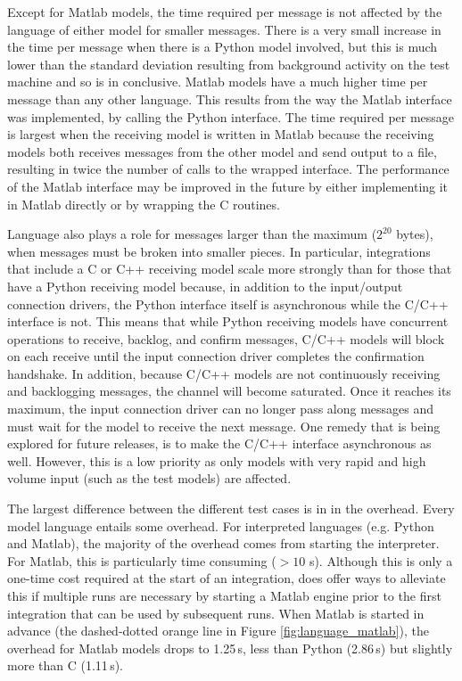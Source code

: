 \documentclass[journal]{IEEEtran}
\newcommand{\todo}[1]{{\color{red}{#1}}}
\newcommand{\pkg}{{\tt \todo{cis\_interface}}{}}
\begin{document}
Except for Matlab models, the time required per message is not affected by the language of either model for smaller messages. There is a very small increase in the time per message when there is a Python model involved, but this is much lower than the standard deviation resulting from background activity on the test machine and so is in conclusive. Matlab models have a much higher time per message than any other language. This results from the way the Matlab interface was implemented, by calling the Python interface. The time required per message is largest when the receiving model is written in Matlab because the receiving models both receives messages from the other model and send output to a file, resulting in twice the number of calls to the wrapped interface. The performance of the Matlab interface may be improved in the future by either implementing it in Matlab directly or by wrapping the C routines.

Language also plays a role for messages larger than the maximum ($2^{20}$ bytes), when messages must be broken into smaller pieces. In particular, integrations that include a C or C++ receiving model scale more strongly than for those that have a Python receiving model because, in addition to the input/output connection drivers, the Python interface itself is asynchronous while the C/C++ interface is not. This means that while Python receiving models have concurrent operations to receive, backlog, and confirm messages, C/C++ models will block on each receive until the input connection driver completes the confirmation handshake. In addition, because C/C++ models are not continuously receiving and backlogging messages, the channel will become saturated. Once it reaches its maximum, the input connection driver can no longer pass along messages and must wait for the model to receive the next message. One remedy that is being explored for future releases, is to make the C/C++ interface asynchronous as well. However, this is a low priority as only models with very rapid and high volume input (such as the test models) are affected.

The largest difference between the different test cases is in in the overhead. Every model language entails some overhead. For interpreted languages (e.g. Python and Matlab), the majority of the overhead comes from starting the interpreter. For Matlab, this is particularly time consuming ($>10$ s). Although this is only a one-time cost required at the start of an integration, {\pkg} does offer ways to alleviate this if multiple runs are necessary by starting a Matlab engine prior to the first integration that can be used by subsequent runs. When Matlab is started in advance (the dashed-dotted orange line in Figure \ref{fig:language_matlab}), the overhead for Matlab models drops to 1.25\,s, less than Python (2.86\,s) but slightly more than C (1.11\,s).
\end{document}
